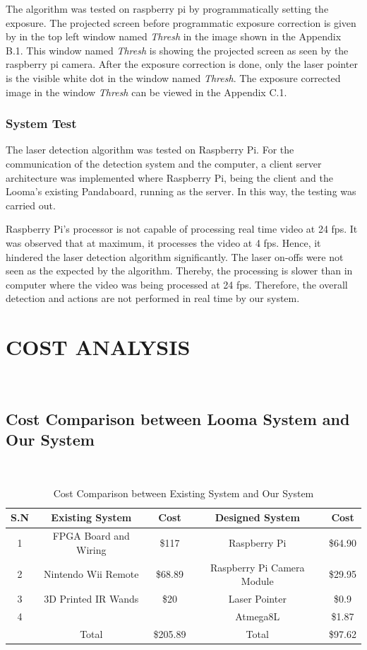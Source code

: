 \documentclass[12pt, a4paper]{article}
\begin{document}
{	The algorithm was tested on raspberry pi by programmatically setting the exposure. The projected screen before programmatic exposure correction is given by in the top left window named \emph{Thresh} in the image shown in the Appendix B.1. This window named \emph{Thresh} is showing the projected screen as seen by the raspberry pi camera. After the exposure correction is done, only the laser pointer is the visible white dot in the window named \emph{Thresh}. The exposure corrected image in the window \emph{Thresh} can be viewed in the Appendix C.1.

\subsubsection{System Test}

The laser detection algorithm was tested on Raspberry Pi. For the communication of the detection system and the computer, a client server architecture was implemented where Raspberry Pi, being the client and the Looma’s existing Pandaboard, running as the server. In this way, the testing was carried out.

Raspberry Pi's processor is not capable of processing real time video at 24 fps. It was observed that at maximum, it processes the video at 4 fps. Hence, it hindered the laser detection algorithm significantly. The laser on-offs were not seen as the expected by the algorithm. Thereby, the processing  is slower than in computer where the video was being processed at 24 fps. Therefore, the overall detection and actions are not performed in real time by our system.

\newpage
\section{COST ANALYSIS}
~\\
\subsection{Cost Comparison between Looma System and Our System}
~\\
\begin{table}[ht]
\begin{tabular}{|c|c|c|c|c|}
\hline
	S.N  & Existing System & Cost & Designed System & Cost\\
\hline
	1 & FPGA Board and Wiring & \$117 & Raspberry Pi & \$64.90\\
\hline
	2 & Nintendo Wii Remote & \$68.89 & Raspberry Pi Camera Module & \$29.95 \\
\hline
	3 & 3D Printed IR Wands & \$20 & Laser Pointer & \$0.9\\
\hline
	4 &  &  & Atmega8L & \$1.87\\
\hline
	 & Total & \$205.89 & Total & \$97.62\\
\hline
\end{tabular}
\caption{Cost Comparison between Existing System and Our System}
\label{tb:sw}
\end{table}

}
\end{document}
